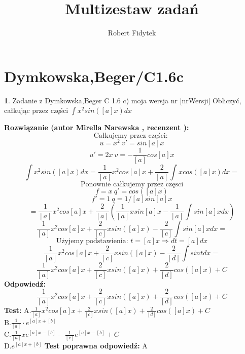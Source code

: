 \documentclass[12pt, a4paper]{article}
\title{Multizestaw zadań}
\author{Robert Fidytek}
\date{}
\theoremstyle{definition} %
\newtheorem{zad}{}
\newcommand{\kategoria}[1]{\section{#1}} %
\newcommand{\zadStart}[1]{\begin{zad}#1\newline} %
\newcommand{\zadStop}{\end{zad}}   %
\newcommand{\rozwStart}[2]{\noindent \textbf{Rozwiązanie (autor #1 , recenzent #2): }\newline} %
\newcommand{\odpStart}{\noindent \textbf{Odpowiedź:}\newline}    %
\newcommand{\odpStop}{\newline}                                             %
\newcommand{\testStart}{\noindent \textbf{Test:}\newline} %
\newcommand{\testStop}{\newline} %
\newcommand{\kluczStart}{\noindent \textbf{Test poprawna odpowiedź:}\newline} %
\newcommand{\kluczStop}{\newline} %
\begin{document}
\maketitle



\kategoria{Dymkowska,Beger/C1.6c}
\zadStart{Zadanie z Dymkowska,Beger C 1.6 c) moja wersja nr [nrWersji]}
Obliczyć, całkując przez części $\displaystyle \int x^2sin([a]x)dx$
\zadStop
\rozwStart{Mirella Narewska}{}
$$\text{Całkujemy przez części: }$$
$$u=x^2 \ v'=sin[a]x$$
$$u'=2x \ v=-\frac{1}{[a]}cos[a]x$$
$$\displaystyle \int x^2sin([a]x)dx=\displaystyle \frac{1}{[a]}x^2cos[a]x+ \frac{2}{[a]}\int xcos([a]x)dx=$$
$$\text{Ponownie całkujemy przez częsci}$$
$$ f=x \ q'=cos([a]x)$$
$$f'=1 \ q=1/[a]sin[a]x$$
$$=\displaystyle \frac{1}{[a]}x^2cos[a]x+ \frac{2}{[a]}\left( \frac{1}{[a]}xsin[a]x-\frac{1}{[a]} \int sin[a]x dx\right)$$
$$\displaystyle \frac{1}{[a]}x^2cos[a]x+\frac{2}{[c]}xsin([a]x)-\frac{2}{[c]} \int sin[a]xdx=$$
$$\text{Użyjemy podstawienia: } t=[a]x \Rightarrow dt=[a]dx$$
$$\displaystyle \frac{1}{[a]}x^2cos[a]x+\frac{2}{[c]}xsin([a]x)-\frac{2}{[d]} \int sint dx=$$
$$\displaystyle \frac{1}{[a]}x^2cos[a]x+\frac{2}{[c]}xsin([a]x)+\frac{2}{[d]}cos([a]x) +C$$
\odpStart
$$\frac{1}{[a]}x^2cos[a]x+\frac{2}{[c]}xsin([a]x)+\frac{2}{[d]}cos([a]x) + C$$
\odpStop
\testStart
A.$\frac{1}{[a]}x^2cos[a]x+\frac{2}{[c]}xsin([a]x)+\frac{2}{[d]}cos([a]x) + C$
\\
B.$\frac{1}{[a]}\cdot e^{[a]x+[b]}$
\\
C.$\frac{1}{[a]}xe^{[a]x-[b]} -\frac{1}{[c]}e^{[a]x-[b]} + C$
\\
D.$e^{[a]x+[b]}$
\testStop
\kluczStart
A
\kluczStop
\end{document}

